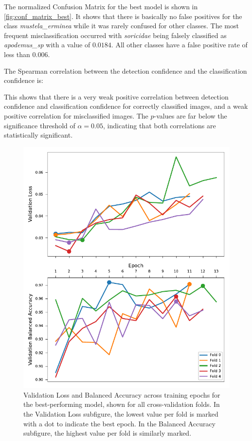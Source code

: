     The normalized Confusion Matrix for the best model is shown in \autoref{fig:conf_matrix_best}.
    It shows that there is basically no false positives for the class \textit{mustela\_erminea} while it was rarely confused for other classes.
    The most frequent misclassification occurred with \textit{soricidae} being falsely classified as \textit{apodemus\_sp} with a value of \(0.0184\).
    All other classes have a false positive rate of less than \(0.006\).

    The Spearman correlation between the detection confidence and the classification confidence is:

    
    
    This shows that there is a very weak positive correlation between detection confidence and classification confidence for correctly classified images, and a weak positive correlation for misclassified images.
    The $p$-values are far below the significance threshold of \( \alpha = 0.05 \), indicating that both correlations are statistically significant.

    

    \begin{figure}[ht]
    \centering
    \includegraphics{figures/training_metrics_best_model.pdf}
    \caption{Validation Loss and Balanced Accuracy across training epochs for the best-performing model, shown for all cross-validation folds. In the Validation Loss subfigure, the lowest value per fold is marked with a dot to indicate the best epoch. In the Balanced Accuracy subfigure, the highest value per fold is similarly marked.}
    \label{fig:training_metrics_best_model}
    \end{figure}    

